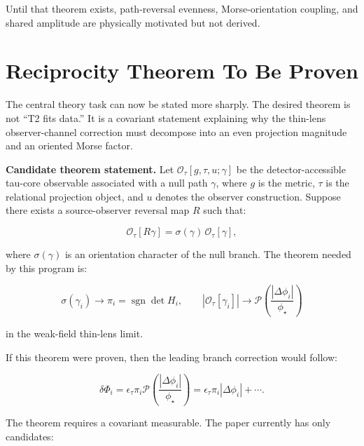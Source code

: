 \documentclass[11pt]{article}
\begin{document}
Until that theorem exists, path-reversal evenness, Morse-orientation
coupling, and shared amplitude are physically motivated but not derived.

\section{Reciprocity Theorem To Be
Proven}\label{reciprocity-theorem-to-be-proven}

The central theory task can now be stated more sharply. The desired
theorem is not ``T2 fits data.'' It is a covariant statement explaining
why the thin-lens observer-channel correction must decompose into an
even projection magnitude and an oriented Morse factor.

\textbf{Candidate theorem statement.} Let
\(\mathcal{O}_\tau[g,\tau,u;\gamma]\) be the detector-accessible
tau-core observable associated with a null path \(\gamma\), where \(g\)
is the metric, \(\tau\) is the relational projection object, and \(u\)
denotes the observer construction. Suppose there exists a
source-observer reversal map \(R\) such that:

\[
\mathcal{O}_\tau[R\gamma]
=
\sigma(\gamma)\,
\mathcal{O}_\tau[\gamma],
\]

where \(\sigma(\gamma)\) is an orientation character of the null branch.
The theorem needed by this program is:

\[
\sigma(\gamma_i)
\longrightarrow
\pi_i=\operatorname{sgn}\det H_i,
\qquad
|\mathcal{O}_\tau[\gamma_i]|
\longrightarrow
\mathcal{P}
\left(
\frac{|\Delta\phi_i|}{\phi_\star}
\right)
\]

in the weak-field thin-lens limit.

If this theorem were proven, then the leading branch correction would
follow:

\[
\delta\Phi_i
=
\epsilon_\tau\pi_i
\mathcal{P}
\left(
\frac{|\Delta\phi_i|}{\phi_\star}
\right)
=
\epsilon_\tau\pi_i|\Delta\phi_i|
+\cdots .
\]

The theorem requires a covariant measurable. The paper currently has
only candidates:
\end{document}
